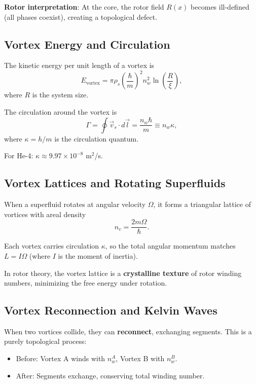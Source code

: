 \documentclass[12pt,a4paper]{article}
\theoremstyle{definition}
\theoremstyle{remark}
\begin{document}
\textbf{Rotor interpretation}: At the core, the rotor field $R(x)$ becomes ill-defined (all phases coexist), creating a topological defect.

\subsection{Vortex Energy and Circulation}

The kinetic energy per unit length of a vortex is
\begin{equation}
E_{\text{vortex}} = \pi \rho_s \left(\frac{\hbar}{m}\right)^2 n_w^2 \ln\left(\frac{R}{\xi}\right),
\end{equation}
where $R$ is the system size.

The circulation around the vortex is
\begin{equation}
\Gamma = \oint \vec{v}_s \cdot d\vec{l} = \frac{n_w \hbar}{m} \equiv n_w \kappa,
\end{equation}
where $\kappa = h/m$ is the circulation quantum.

For He-4: $\kappa \approx 9.97 \times 10^{-8}$ m$^2$/s.

\subsection{Vortex Lattices and Rotating Superfluids}

When a superfluid rotates at angular velocity $\Omega$, it forms a triangular lattice of vortices with areal density
\begin{equation}
n_v = \frac{2m\Omega}{\hbar}.
\end{equation}

Each vortex carries circulation $\kappa$, so the total angular momentum matches $L = I \Omega$ (where $I$ is the moment of inertia).

In rotor theory, the vortex lattice is a \textbf{crystalline texture} of rotor winding numbers, minimizing the free energy under rotation.

\subsection{Vortex Reconnection and Kelvin Waves}

When two vortices collide, they can \textbf{reconnect}, exchanging segments. This is a purely topological process:
\begin{itemize}
\item Before: Vortex A winds with $n_w^A$, Vortex B with $n_w^B$.
\item After: Segments exchange, conserving total winding number.
\end{itemize}
\end{document}
